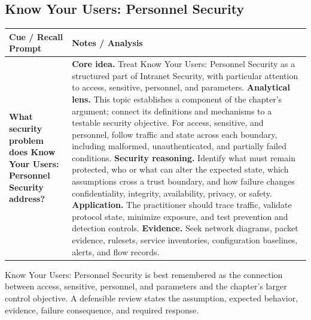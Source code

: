 \documentclass[11pt]{article}
\newcommand{\CornellHeader}{%
\rowcolor{Navy}\color{white}\bfseries Cue / Recall Prompt & \color{white}\bfseries Notes / Analysis\\\hline}
\newcommand{\CornellRow}[2]{%
\cellcolor{CueGray}\RaggedRight\textbf{#1} & \RaggedRight #2\\\hline}
\begin{document}
\subsection*{Know Your Users: Personnel Security}
\begin{longtable}{>{\RaggedRight\arraybackslash}p{}|>{\RaggedRight\arraybackslash}p{}}
\CornellHeader
\CornellRow{What security problem does Know Your Users: Personnel Security address?}{\textbf{Core idea.} Treat Know Your Users: Personnel Security as a structured part of Intranet Security, with particular attention to access, sensitive, personnel, and parameters. \textbf{Analytical lens.} This topic establishes a component of the chapter's argument; connect its definitions and mechanisms to a testable security objective. For access, sensitive, and personnel, follow traffic and state across each boundary, including malformed, unauthenticated, and partially failed conditions. \textbf{Security reasoning.} Identify what must remain protected, who or what can alter the expected state, which assumptions cross a trust boundary, and how failure changes confidentiality, integrity, availability, privacy, or safety. \textbf{Application.} The practitioner should trace traffic, validate protocol state, minimize exposure, and test prevention and detection controls. \textbf{Evidence.} Seek network diagrams, packet evidence, rulesets, service inventories, configuration baselines, alerts, and flow records.}
\end{longtable}
\begin{topicsummary}
Know Your Users: Personnel Security is best remembered as the connection between access, sensitive, personnel, and parameters and the chapter's larger control objective. A defensible review states the assumption, expected behavior, evidence, failure consequence, and required response.
\end{topicsummary}
\end{document}
